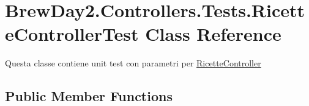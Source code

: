 \hypertarget{class_brew_day2_1_1_controllers_1_1_tests_1_1_ricette_controller_test}{}\section{Brew\+Day2.\+Controllers.\+Tests.\+Ricette\+Controller\+Test Class Reference}
\label{class_brew_day2_1_1_controllers_1_1_tests_1_1_ricette_controller_test}


Questa classe contiene unit test con parametri per \mbox{\hyperlink{class_brew_day2_1_1_controllers_1_1_ricette_controller}{Ricette\+Controller}} 


\subsection*{Public Member Functions}
